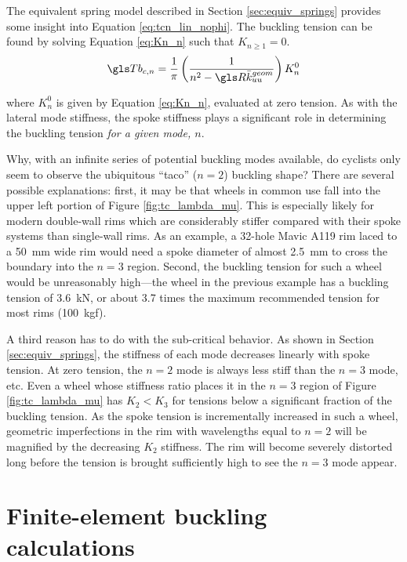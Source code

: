 \documentclass[\rootdir/thesis.tex]{subfiles}
\begin{document}
The equivalent spring model described in Section \ref{sec:equiv_springs} provides some insight into Equation \eqref{eq:tcn_lin_nophi}. The buckling tension can be found by solving Equation \eqref{eq:Kn_n} such that $K_{n\geq 1} = 0$.
\begin{equation}
\label{eq:Tcn_equiv_springs}
\Tb_{c,n} = \frac{1}{\pi}\left(\frac{1}{n^2 - \R\geom{\kuu}}\right) K_n^0
\end{equation}

where $K_n^0$ is given by Equation \eqref{eq:Kn_n}, evaluated at zero tension. As with the lateral mode stiffness, the spoke stiffness plays a significant role in determining the buckling tension \emph{for a given mode, $n$}.

Why, with an infinite series of potential buckling modes available, do cyclists only seem to observe the ubiquitous ``taco'' ($n=2$) buckling shape? There are several possible explanations: first, it may be that wheels in common use fall into the upper left portion of Figure \ref{fig:tc_lambda_mu}. This is especially likely for modern double-wall rims which are considerably stiffer compared with their spoke systems than single-wall rims. As an example, a 32-hole Mavic A119 rim laced to a \SI{50}{mm} wide rim would need a spoke diameter of almost \SI{2.5}{mm} to cross the boundary into the $n=3$ region. Second, the buckling tension for such a wheel would be unreasonably high---the wheel in the previous example has a buckling tension of \SI{3.6}{kN}, or about 3.7 times the maximum recommended tension for most rims (\SI{100}{kgf}).

A third reason has to do with the sub-critical behavior. As shown in Section \ref{sec:equiv_springs}, the stiffness of each mode decreases linearly with spoke tension. At zero tension, the $n=2$ mode is always less stiff than the $n=3$ mode, etc. Even a wheel whose stiffness ratio places it in the $n=3$ region of Figure \ref{fig:tc_lambda_mu} has $K_2<K_3$ for tensions below a significant fraction of the buckling tension. As the spoke tension is incrementally increased in such a wheel, geometric imperfections in the rim with wavelengths equal to $n=2$ will be magnified by the decreasing $K_2$ stiffness. The rim will become severely distorted long before the tension is brought sufficiently high to see the $n=3$ mode appear.


\section{Finite-element buckling calculations}
\end{document}
